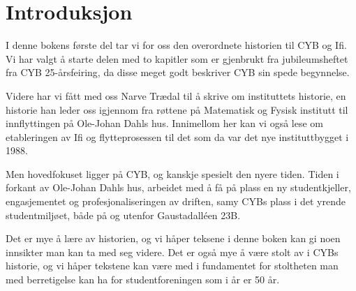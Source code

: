 \chapter*{Introduksjon}

\setcounter{footnote}{0}

I denne bokens første del tar vi for oss den overordnete historien til CYB og Ifi. Vi har valgt å starte delen med to kapitler som er gjenbrukt fra jubileumsheftet fra CYB 25-årsfeiring, da disse meget godt beskriver CYB sin spede begynnelse.

Videre har vi fått med oss Narve Trædal til å skrive om instituttets historie, en historie han leder oss igjennom fra røttene på Matematisk og Fysisk institutt til innflyttingen på Ole-Johan Dahls hus. Innimellom her kan vi også lese om etableringen av Ifi og flytteprosessen til det som da var det nye instituttbygget i 1988.

Men hovedfokuset ligger på CYB, og kanskje spesielt den nyere tiden. Tiden i forkant av Ole-Johan Dahls hus, arbeidet med å få på plass en ny studentkjeller, engasjementet og profesjonaliseringen av driften, samy CYBs plass i det yrende studentmiljøet, både på og utenfor Gaustadalléen 23B.

Det er mye å lære av historien, og vi håper teksene i denne boken kan gi noen innsikter man kan ta med seg videre. Det er også mye å være stolt av i CYBs historie, og vi håper tekstene kan være med i fundamentet for stoltheten man med berretigelse kan ha for studentforeningen som i år er 50 år.